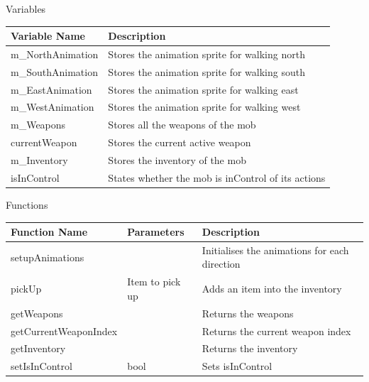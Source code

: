 \documentclass[../../Main.tex]{subfiles}
\begin{document}
    \begin{center}
        Variables
        \begin{tabular}{ | m{} | m{} | }
            \hline
            \textbf{Variable Name} & \textbf{Description} \\
            \hline
            m\_NorthAnimation & Stores the animation sprite for walking north \\
            \hline
            m\_SouthAnimation & Stores the animation sprite for walking south \\
            \hline
            m\_EastAnimation & Stores the animation sprite for walking east \\
            \hline
            m\_WestAnimation & Stores the animation sprite for walking west \\
            \hline
            m\_Weapons & Stores all the weapons of the mob \\
            \hline
            currentWeapon & Stores the current active weapon \\
            \hline
            m\_Inventory & Stores the inventory of the mob \\
            \hline
            isInControl & States whether the mob is inControl of its actions \\
            \hline
        \end{tabular}
        Functions
        \begin{tabular}{ | m{} | m{}| m{} | }
            \hline
            \textbf{Function Name} & \textbf{Parameters} & \textbf{Description} \\
            \hline
            setupAnimations & & Initialises the animations for each direction \\
            \hline
            pickUp & Item to pick up & Adds an item into the inventory \\
            \hline
            getWeapons & & Returns the weapons \\
            \hline
            getCurrentWeaponIndex & & Returns the current weapon index \\
            \hline
            getInventory & & Returns the inventory \\
            \hline
            setIsInControl & bool & Sets isInControl \\
            \hline
        \end{tabular}
    \end{center}
\end{document}
